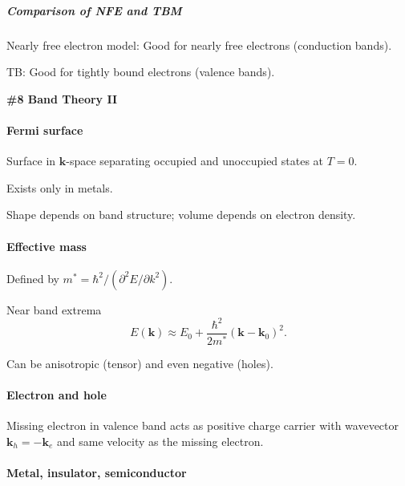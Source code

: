 \subparagraph{Comparison of NFE and TBM}

\begin{enumext}
  \item Nearly free electron model:
  Good for nearly free electrons (conduction bands).
  \item TB: Good for tightly bound electrons (valence bands).
\end{enumext}

\begin{framed}\large\bfseries
  \#8 Band Theory II
\end{framed}

\paragraph{Fermi surface}

\begin{enumext}
  \item Surface in $\bm k$-space separating occupied and unoccupied states
  at $T=0$.
  \item  Exists only in metals.
  \item Shape depends on band structure; volume depends on electron density.
\end{enumext}

\paragraph{Effective mass}

\begin{enumext}
  \item Defined by $m^* = \hbar^2 / (\partial^2 E/\partial k^2)$.
  \item Near band extrema
  \[
    E(\bm k) \approx E_0 + \frac{\hbar^2}{2m^*} (\bm k - \bm k_0)^2.
  \]
  \item Can be anisotropic (tensor) and even negative (holes).
\end{enumext}

\paragraph{Electron and hole}

Missing electron in valence band acts as positive charge carrier with
wavevector $\bm k_h = -\bm k_e$ and same velocity as the missing electron.

\paragraph{Metal, insulator, semiconductor}

